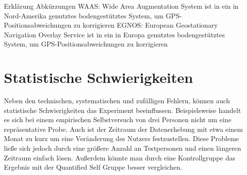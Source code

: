 Erklärung Abkürzungen
WAAS: 
Wide Area Augmentation System ist in ein in Nord-Amerika genutztes bodengestütztes System, um GPS-Positionsabweichungen zu korrigieren
EGNOS: 
European Geostationary Navigation Overlay Service ist in ein in Europa genutztes bodengestütztes System, um GPS-Positionsabweichungen zu korrigieren


\section{Statistische Schwierigkeiten}
\label{ch:Relativierung:sec:StatistischeSchwierigkeiten}

Neben den technischen, systematischen und zufälligen Fehlern, können auch statistische Schwierigkeiten das Experiment beeinflussen.
Beispielsweise handelt es sich bei einem empirischen Selbstversuch von drei Personen nicht um eine repräsentative Probe.
Auch ist der Zeitraum der Datenerhebung mit etwa einem Monat zu kurz um eine Veränderung des Nutzers festzustellen.
Diese Probleme ließe sich jedoch durch eine größere Anzahl an Testpersonen und einen längeren Zeitraum einfach lösen.
Außerdem könnte man durch eine Kontrollgruppe das Ergebnis mit der Quantified Self Gruppe besser vergleichen. 









